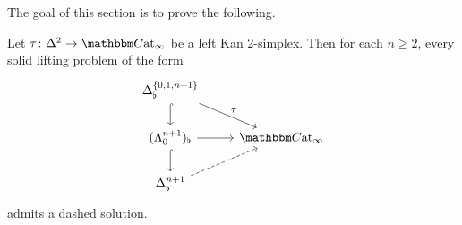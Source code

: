 \documentclass[main.tex]{subfiles}
\begin{document}
The goal of this section is to prove the following.

\begin{theorem}
  \label{thm:left_kan_implies_globally_left_kan}
  Let $\tau\colon \Delta^{2} \to \ICCat$ be a left Kan 2-simplex. Then for each $n \geq 2$, every solid lifting problem of the form
  \begin{equation}
    \label{eq:lifting_problems_for_global_kan_extensions}
    \begin{tikzcd}
      \Delta^{\{0,1,n+1\}}_{\flat}
      \arrow[d, hook]
      \arrow[dr, "\tau"]
      \\
      (\Lambda^{n+1}_{0})_{\flat}
      \arrow[r]
      \arrow[d, hook]
      & \ICCat
      \\
      \Delta^{n+1}_{\flat}
      \arrow[ur, dashed]
    \end{tikzcd}
  \end{equation}
  admits a dashed solution.
\end{theorem}

\end{document}
